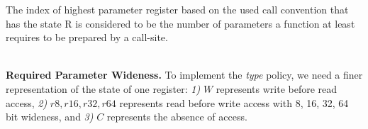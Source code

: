 %
%
%

The index of highest parameter register based on the used call convention that has the state R is considered to be the number of parameters a function at least requires to be prepared by a call-site.

~\\
\textbf{Required Parameter Wideness.}
\label{subsection:requiredparamwideness}
To implement the \emph{type} policy, we need a finer representation of the state of one register:
\textit{1)} $W$ represents write before read access,
\textit{2)} $r8, r16, r32, r64$ represents read before write access with 8, 16, 32, 64 bit wideness, and
\textit{3)} $C$ represents the absence of access.


